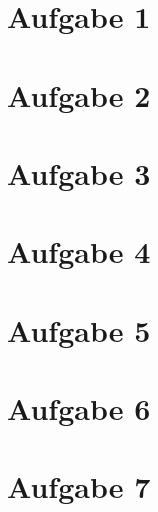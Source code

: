 \documentclass{article}
\begin{document}
  
\section*{Aufgabe 1}


\section*{Aufgabe 2}

  
\section*{Aufgabe 3}

  
\section*{Aufgabe 4}


\section*{Aufgabe 5}


\section*{Aufgabe 6}


\section*{Aufgabe 7}

  
\end{document}
